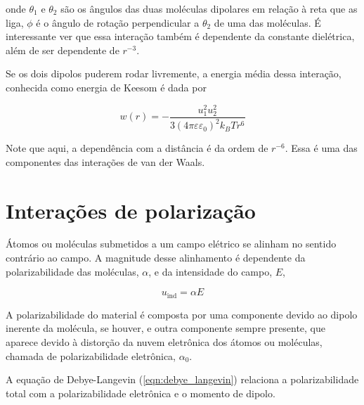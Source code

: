 	\noindent onde \(\theta_{ 1 }\) e \(\theta_{ 2 }\) são os ângulos das duas moléculas dipolares em relação à reta que as liga, \(\phi\) é o ângulo de rotação perpendicular a \(\theta_{ 2 }\) de uma das moléculas. É interessante ver que essa interação também é dependente da constante dielétrica, além de ser dependente de \(r^{-3}\).  %
	
	Se os dois dipolos puderem rodar livremente, a energia média dessa interação, conhecida como energia de Keesom é dada por
	
	\begin{equation}
		w(r) = - \dfrac{u _ { 1 } ^ { 2 } u _ { 2 } ^ { 2 } }{ 3 \left( 4 \pi \varepsilon \varepsilon _ { 0 } \right) ^ { 2 } k_B T r ^ { 6 } }
		\label{eqn:energia_Keesom}
	\end{equation}  
	
	Note que aqui, a dependência com a distância é da ordem de \(r^{-6}\). Essa é uma das componentes das interações de van der Waals. 
	
	\section{Interações de polarização} 
	
	Átomos ou moléculas submetidos a um campo elétrico se alinham no sentido contrário ao campo. A magnitude desse alinhamento é dependente da polarizabilidade das moléculas, \(\alpha\), e da intensidade do campo, \(E\),
	
	\begin{equation}
		u_{\mathrm{ind}} = \alpha E
		\label{eqn:dipolo_induzido}
	\end{equation} 
	
	A polarizabilidade do material é composta por uma componente devido ao dipolo inerente da molécula, se houver, e outra componente sempre presente, que aparece devido à distorção da nuvem eletrônica dos átomos ou moléculas, chamada de polarizabilidade eletrônica, \(\alpha_0\). 
	
	A equação de Debye-Langevin (\autoref{eqn:debye_langevin}) relaciona a polarizabilidade total com a polarizabilidade eletrônica e o momento de dipolo.
	
